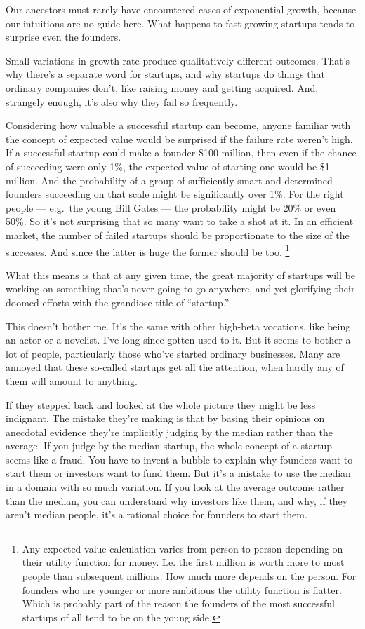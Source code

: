 Our ancestors must rarely have encountered cases of exponential growth,
because our intuitions are no guide here. What happens to fast growing
startups tends to surprise even the founders.

Small variations in growth rate produce qualitatively different
outcomes. That's why there's a separate word for startups, and why
startups do things that ordinary companies don't, like raising money and
getting acquired. And, strangely enough, it's also why they fail so
frequently.

Considering how valuable a successful startup can become, anyone
familiar with the concept of expected value would be surprised if the
failure rate weren't high. If a successful startup could make a founder
\$100 million, then even if the chance of succeeding were only 1\%, the
expected value of starting one would be \$1 million. And the probability
of a group of sufficiently smart and determined founders succeeding on
that scale might be significantly over 1\%. For the right people ---
e.g.~the young Bill Gates --- the probability might be 20\% or even
50\%. So it's not surprising that so many want to take a shot at it. In
an efficient market, the number of failed startups should be
proportionate to the size of the successes. And since the latter is huge
the former should be too. \footnote{Any expected value calculation varies from person to person
depending on their utility function for money. I.e. the first million is
worth more to most people than subsequent millions. How much more
depends on the person. For founders who are younger or more ambitious
the utility function is flatter. Which is probably part of the reason
the founders of the most successful startups of all tend to be on the
young side.}

What this means is that at any given time, the great majority of
startups will be working on something that's never going to go anywhere,
and yet glorifying their doomed efforts with the grandiose title of
``startup.''

This doesn't bother me. It's the same with other high-beta vocations,
like being an actor or a novelist. I've long since gotten used to it.
But it seems to bother a lot of people, particularly those who've
started ordinary businesses. Many are annoyed that these so-called
startups get all the attention, when hardly any of them will amount to
anything.

If they stepped back and looked at the whole picture they might be less
indignant. The mistake they're making is that by basing their opinions
on anecdotal evidence they're implicitly judging by the median rather
than the average. If you judge by the median startup, the whole concept
of a startup seems like a fraud. You have to invent a bubble to explain
why founders want to start them or investors want to fund them. But it's
a mistake to use the median in a domain with so much variation. If you
look at the average outcome rather than the median, you can understand
why investors like them, and why, if they aren't median people, it's a
rational choice for founders to start them.

